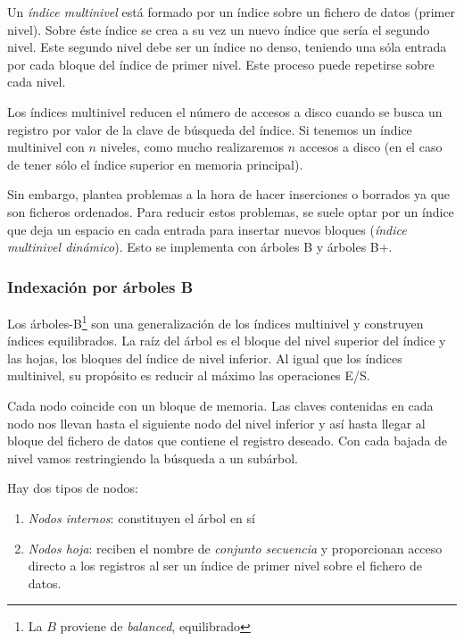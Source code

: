 \documentclass[10pt,a4paper,spanish]{report}
\begin{document}
Un \textcolor[rgb]{1,0.2,0.3}{\textit{índice multinivel}} está formado por un índice sobre un fichero de datos (primer nivel). Sobre éste índice se crea a su vez un nuevo índice que sería el segundo nivel. Este segundo nivel debe ser un índice no denso, teniendo una sóla entrada por cada bloque del índice de primer nivel. Este proceso puede repetirse sobre cada nivel.



Los índices multinivel reducen el número de accesos a disco cuando se busca un registro por valor de la clave de búsqueda del índice. Si tenemos un índice multinivel con $n$ niveles, como mucho realizaremos $n$ accesos a disco (en el caso de tener sólo el índice superior en memoria principal).

Sin embargo, plantea problemas a la hora de hacer inserciones o borrados ya que son ficheros ordenados. Para reducir estos problemas, se suele optar por un índice que deja un espacio en cada entrada para insertar nuevos bloques (\textcolor[rgb]{1,0.2,0.3}{\textit{índice multinivel dinámico}}). Esto se implementa con árboles B y árboles B+.

\textcolor[rgb]{1,0.2,0.3}{\subsubsection{Indexación por árboles B}}
Los árboles-B\footnote{La $B$ proviene de \textit{\textcolor[rgb]{1,0.2,0.3}{balanced}}, equilibrado} son una generalización de los índices multinivel y construyen índices equilibrados. La raíz del árbol es el bloque del nivel superior del índice y las hojas, los bloques del índice de nivel inferior. Al igual que los índices multinivel, su propósito es reducir al máximo las operaciones E/S.

Cada nodo coincide con un bloque de memoria. Las claves contenidas en cada nodo nos llevan hasta el siguiente nodo del nivel inferior y así hasta llegar al bloque del fichero de datos que contiene el registro deseado. Con cada bajada de nivel vamos restringiendo la búsqueda a un subárbol.

\begin{center}

\end{center}

Hay dos tipos de nodos:
\begin{enumerate}[$\heartsuit$]
    \item \textcolor[rgb]{1,0.2,0.3}{\textit{Nodos internos}}: constituyen el árbol en sí
    \item \textcolor[rgb]{1,0.2,0.3}{\textit{Nodos hoja}}: reciben el nombre de \textcolor[rgb]{1,0.2,0.3}{\textit{conjunto secuencia}} y proporcionan acceso directo a los registros al ser un índice de primer nivel sobre el fichero de datos.
\end{enumerate}
\end{document}
